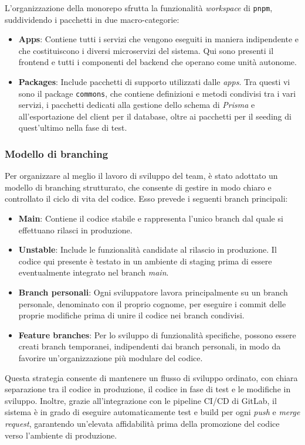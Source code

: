L'organizzazione della monorepo sfrutta la funzionalità \textit{workspace} di \texttt{pnpm}, suddividendo i pacchetti in due macro-categorie:
\begin{itemize}
  \item \textbf{Apps}: Contiene tutti i servizi che vengono eseguiti in maniera indipendente e che costituiscono i diversi microservizi del sistema. Qui sono presenti il frontend e tutti i componenti del backend che operano come unità autonome.
  \item \textbf{Packages}: Include pacchetti di supporto utilizzati dalle \textit{apps}. Tra questi vi sono il package \texttt{commons}, che contiene definizioni e metodi condivisi tra i vari servizi, i pacchetti dedicati alla gestione dello schema di \textit{Prisma} e all'esportazione del client per il database, oltre ai pacchetti per il seeding di quest'ultimo nella fase di test.
\end{itemize}

\subsubsection{Modello di branching}
Per organizzare al meglio il lavoro di sviluppo del team, è stato adottato un modello di branching strutturato, che consente di gestire in modo chiaro e controllato il ciclo di vita del codice. Esso prevede i seguenti branch principali:
\begin{itemize}
  \item \textbf{Main}: Contiene il codice stabile e rappresenta l'unico branch dal quale si effettuano rilasci in produzione.
  \item \textbf{Unstable}: Include le funzionalità candidate al rilascio in produzione. Il codice qui presente è testato in un ambiente di staging prima di essere eventualmente integrato nel branch \textit{main}.
  \item \textbf{Branch personali}: Ogni sviluppatore lavora principalmente su un branch personale, denominato con il proprio cognome, per eseguire i commit delle proprie modifiche prima di unire il codice nei branch condivisi.
  \item \textbf{Feature branches}: Per lo sviluppo di funzionalità specifiche, possono essere creati branch temporanei, indipendenti dai branch personali, in modo da favorire un'organizzazione più modulare del codice.
\end{itemize}

Questa strategia consente di mantenere un flusso di sviluppo ordinato, con chiara separazione tra il codice in produzione, il codice in fase di test e le modifiche in sviluppo. Inoltre, grazie all'integrazione con le pipeline CI/CD di GitLab, il sistema è in grado di eseguire automaticamente test e build per ogni \textit{push} e \textit{merge request}, garantendo un'elevata affidabilità prima della promozione del codice verso l'ambiente di produzione.

